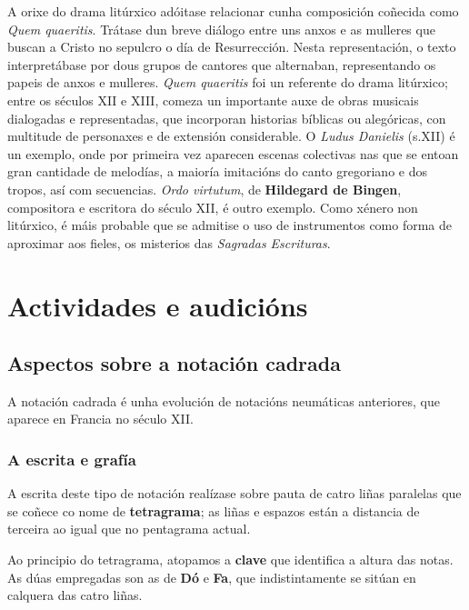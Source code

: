 \documentclass[a4paper, twoside]{templates/ociamthesis}
\begin{document}
A orixe do drama litúrxico adóitase relacionar cunha composición coñecida como \emph{Quem quaeritis}. Trátase dun breve diálogo entre uns anxos e as mulleres que buscan a Cristo no sepulcro o día de Resurrección. Nesta representación, o texto interpretábase por dous grupos de cantores que alternaban, representando os papeis de anxos e mulleres. \emph{Quem quaeritis} foi un referente do drama litúrxico; entre os séculos XII e XIII, comeza un importante auxe de obras musicais dialogadas e representadas, que incorporan historias bíblicas ou alegóricas, con multitude de personaxes e de extensión considerable. O \emph{Ludus Danielis} (s.XII) é un exemplo, onde por primeira vez aparecen escenas colectivas nas que se entoan gran cantidade de melodías, a maioría imitacións do canto gregoriano e dos tropos, así com secuencias. \emph{Ordo virtutum}, de \textbf{Hildegard de Bingen}, compositora e escritora do século XII, é outro exemplo. Como xénero non litúrxico, é máis probable que se admitise o uso de instrumentos como forma de aproximar aos fieles, os misterios das \emph{Sagradas Escrituras}.

\newpage

\hypertarget{actividades-e-audiciuxf3ns-3}{%
\section{Actividades e audicións}\label{actividades-e-audiciuxf3ns-3}}

\hypertarget{aspectos-sobre-a-notaciuxf3n-cadrada}{%
\subsection{Aspectos sobre a notación cadrada}\label{aspectos-sobre-a-notaciuxf3n-cadrada}}

A notación cadrada é unha evolución de notacións neumáticas anteriores, que aparece en Francia no século XII.

\hypertarget{a-escrita-e-grafuxeda}{%
\subsubsection{A escrita e grafía}\label{a-escrita-e-grafuxeda}}

A escrita deste tipo de notación realízase sobre pauta de catro liñas paralelas que se coñece co nome de \textbf{tetragrama}; as liñas e espazos están a distancia de terceira ao igual que no pentagrama actual.

Ao principio do tetragrama, atopamos a \textbf{clave} que identifica a altura das notas. As dúas empregadas son as de \textbf{Dó} e \textbf{Fa}, que indistintamente se sitúan en calquera das catro liñas.
\end{document}

